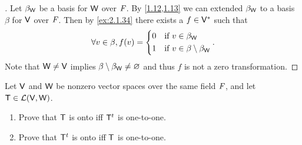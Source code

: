 \begin{proof}[]
  Let \(\beta_{\mathsf{W}}\) be a basis for \(\mathsf{W}\) over \(\mathit{F}\).
  By \cref{1.12,1.13} we can extended \(\beta_{\mathsf{W}}\) to a basis \(\beta\) for \(\mathsf{V}\) over \(\mathit{F}\).
  Then by \cref{ex:2.1.34} there exists a \(f \in \mathsf{V}^*\) such that
  \[
    \forall v \in \beta, f(v) = \begin{dcases}
      0 & \text{if } v \in \beta_{\mathsf{W}}                 \\
      1 & \text{if } v \in \beta \setminus \beta_{\mathsf{W}}
    \end{dcases}.
  \]
  Note that \(\mathsf{W} \neq \mathsf{V}\) implies \(\beta \setminus \beta_{\mathsf{W}} \neq \varnothing\) and thus \(f\) is not a zero transformation.
\end{proof}

\begin{ex}\label{ex:2.6.20}
  Let \(\mathsf{V}\) and \(\mathsf{W}\) be nonzero vector spaces over the same field \(\mathit{F}\), and let \(\mathsf{T} \in \mathcal{L}(\mathsf{V}, \mathsf{W})\).
  \begin{enumerate}
    \item Prove that \(\mathsf{T}\) is onto iff \({\mathsf{T}}^{t}\) is one-to-one.
    \item Prove that \({\mathsf{T}}^{t}\) is onto iff \(\mathsf{T}\) is one-to-one.
  \end{enumerate}
\end{ex}

